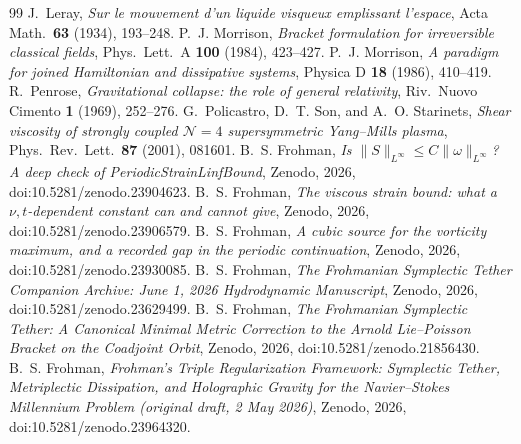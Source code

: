 \documentclass[11pt]{amsart}
\theoremstyle{definition}
\theoremstyle{remark}
\begin{document}
\begin{thebibliography}{99}
 J.~Leray, \emph{Sur le mouvement d'un liquide visqueux emplissant l'espace}, Acta Math.\ \textbf{63} (1934), 193--248.
 P.~J. Morrison, \emph{Bracket formulation for irreversible classical fields}, Phys.\ Lett.\ A \textbf{100} (1984), 423--427.
 P.~J. Morrison, \emph{A paradigm for joined Hamiltonian and dissipative systems}, Physica D \textbf{18} (1986), 410--419.
 R.~Penrose, \emph{Gravitational collapse: the role of general relativity}, Riv.\ Nuovo Cimento \textbf{1} (1969), 252--276.
 G.~Policastro, D.~T. Son, and A.~O. Starinets, \emph{Shear viscosity of strongly coupled $\mathcal{N}=4$ supersymmetric Yang--Mills plasma}, Phys.\ Rev.\ Lett.\ \textbf{87} (2001), 081601.
 B.~S. Frohman, \emph{Is $\|S\|_{L^\infty}\le C\|\omega\|_{L^\infty}$? A deep check of PeriodicStrainLinfBound}, Zenodo, 2026, doi:10.5281/zenodo.23904623.
 B.~S. Frohman, \emph{The viscous strain bound: what a $\nu,t$-dependent constant can and cannot give}, Zenodo, 2026, doi:10.5281/zenodo.23906579.
 B.~S. Frohman, \emph{A cubic source for the vorticity maximum, and a recorded gap in the periodic continuation}, Zenodo, 2026, doi:10.5281/zenodo.23930085.
 B.~S. Frohman, \emph{The Frohmanian Symplectic Tether Companion Archive: June 1, 2026 Hydrodynamic Manuscript}, Zenodo, 2026, doi:10.5281/zenodo.23629499.
 B.~S. Frohman, \emph{The Frohmanian Symplectic Tether: A Canonical Minimal Metric Correction to the Arnold Lie--Poisson Bracket on the Coadjoint Orbit}, Zenodo, 2026, doi:10.5281/zenodo.21856430.
 B.~S. Frohman, \emph{Frohman's Triple Regularization Framework: Symplectic Tether, Metriplectic Dissipation, and Holographic Gravity for the Navier--Stokes Millennium Problem (original draft, 2 May 2026)}, Zenodo, 2026, doi:10.5281/zenodo.23964320.
\end{thebibliography}
\end{document}
